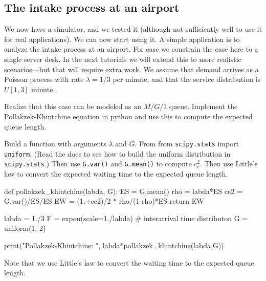 \documentclass{scrartcl}
\begin{document}
\subsection{The intake process at an airport}
\label{sec:intake-process-at}

We now have a simulator, and we tested it (although not sufficiently well to use it for real applications).
We can now start using it.
A simple application is to analyze the intake process at an airport.
For ease we constrain the case here to a single server desk.
In the next tutorials we will extend this to more realistic scenarios---but that will require extra work.
We assume that demand arrives as a Poisson process with rate $\lambda=1/3$ per minute, and that the service distribution is $U[1,3]$ minute.


\begin{exercise}\label{ex:5}
  Realize that this case can be modeled as an $M/G/1$ queue.
  Implement the Pollakzek-Khintchine equation in python and use this to compute the expected queue length.

  \hintsymbol
  \begin{hint}
Build a function with arguments $\lambda$ and $G$. From from \texttt{scipy.stats} import \texttt{uniform}. (Read the docs to see how to build the uniform distribution in \texttt{scipy.stats}.) Then use \texttt{G.var()} and \texttt{G.mean()} to compute $c_e^2$.  Then use Little's law to convert the expected waiting time to the expected queue length. 
  \end{hint}
  \begin{solution}
    \begin{pyblock}

def pollakzek_khintchine(labda, G):
    ES = G.mean()
    rho = labda*ES
    ce2 = G.var()/ES/ES
    EW = (1.+ce2)/2 * rho/(1-rho)*ES
    return EW

    
labda = 1./3
F = expon(scale=1./labda)  # interarrival time distributon
G = uniform(1, 2)

print("Pollakzek-Khintchine: ", labda*pollakzek_khintchine(labda,G))
      
    \end{pyblock}

Note that we use Little's law to convert the waiting time to the expected queue length.

  \end{solution}

\end{exercise}
\end{document}
